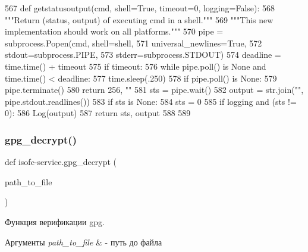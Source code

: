 \begin{DoxyCode}
567 \textcolor{keyword}{def }getstatusoutput(cmd, shell=True, timeout=0, logging=False):
568     \textcolor{stringliteral}{"""Return (status, output) of executing cmd in a shell."""}
569     \textcolor{stringliteral}{"""This new implementation should work on all platforms."""}
570     pipe = subprocess.Popen(cmd, shell=shell,
571                             universal\_newlines=\textcolor{keyword}{True},
572                             stdout=subprocess.PIPE,
573                             stderr=subprocess.STDOUT)
574     deadline = time.time() + timeout
575     \textcolor{keywordflow}{if} timeout:
576         \textcolor{keywordflow}{while} pipe.poll() \textcolor{keywordflow}{is} \textcolor{keywordtype}{None} \textcolor{keywordflow}{and} time.time() < deadline:
577             time.sleep(.250)
578         \textcolor{keywordflow}{if} pipe.poll() \textcolor{keywordflow}{is} \textcolor{keywordtype}{None}:
579             pipe.terminate()
580             \textcolor{keywordflow}{return} 256, \textcolor{stringliteral}{""}
581     sts = pipe.wait()
582     output = str.join(\textcolor{stringliteral}{""}, pipe.stdout.readlines())
583     \textcolor{keywordflow}{if} sts \textcolor{keywordflow}{is} \textcolor{keywordtype}{None}:
584         sts = 0
585     \textcolor{keywordflow}{if} logging \textcolor{keywordflow}{and} (sts != 0):
586         Log(output)
587     \textcolor{keywordflow}{return} sts, output
588 
589 
\end{DoxyCode}
\mbox{\label{isofc-service_8py_file_a439962da72c4d0e197a5e8247af9f379}} 
\subsubsection{\texorpdfstring{gpg\+\_\+decrypt()}{gpg\_decrypt()}}
{\footnotesize\ttfamily def isofc-\/service.\+gpg\+\_\+decrypt (\begin{DoxyParamCaption}\item[{}]{path\+\_\+to\+\_\+file }\end{DoxyParamCaption})}



Функция верификации gpg. 


\begin{DoxyParams}{Аргументы}
{\em path\+\_\+to\+\_\+file} & -\/ путь до файла \\
\hline
\end{DoxyParams}

